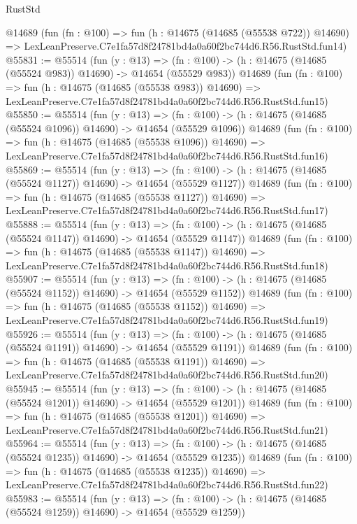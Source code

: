 \begin{lexlean}{RustStd}
\begin{coremodule}
    @14689
    (fun (fn : @100) =>
    fun (h : @14675 (@14685 (@55538 @722)) @14690) =>
    LexLeanPreserve.C7e1fa57d8f24781bd4a0a60f2bc744d6.R56.RustStd.fun14)
@55831 := @55514
    (fun (y : @13) =>
    (fn : @100) -> (h : @14675 (@14685 (@55524 @983)) @14690) -> @14654 (@55529 @983))
    @14689
    (fun (fn : @100) =>
    fun (h : @14675 (@14685 (@55538 @983)) @14690) =>
    LexLeanPreserve.C7e1fa57d8f24781bd4a0a60f2bc744d6.R56.RustStd.fun15)
@55850 := @55514
    (fun (y : @13) =>
    (fn : @100) -> (h : @14675 (@14685 (@55524 @1096)) @14690) -> @14654 (@55529 @1096))
    @14689
    (fun (fn : @100) =>
    fun (h : @14675 (@14685 (@55538 @1096)) @14690) =>
    LexLeanPreserve.C7e1fa57d8f24781bd4a0a60f2bc744d6.R56.RustStd.fun16)
@55869 := @55514
    (fun (y : @13) =>
    (fn : @100) -> (h : @14675 (@14685 (@55524 @1127)) @14690) -> @14654 (@55529 @1127))
    @14689
    (fun (fn : @100) =>
    fun (h : @14675 (@14685 (@55538 @1127)) @14690) =>
    LexLeanPreserve.C7e1fa57d8f24781bd4a0a60f2bc744d6.R56.RustStd.fun17)
@55888 := @55514
    (fun (y : @13) =>
    (fn : @100) -> (h : @14675 (@14685 (@55524 @1147)) @14690) -> @14654 (@55529 @1147))
    @14689
    (fun (fn : @100) =>
    fun (h : @14675 (@14685 (@55538 @1147)) @14690) =>
    LexLeanPreserve.C7e1fa57d8f24781bd4a0a60f2bc744d6.R56.RustStd.fun18)
@55907 := @55514
    (fun (y : @13) =>
    (fn : @100) -> (h : @14675 (@14685 (@55524 @1152)) @14690) -> @14654 (@55529 @1152))
    @14689
    (fun (fn : @100) =>
    fun (h : @14675 (@14685 (@55538 @1152)) @14690) =>
    LexLeanPreserve.C7e1fa57d8f24781bd4a0a60f2bc744d6.R56.RustStd.fun19)
@55926 := @55514
    (fun (y : @13) =>
    (fn : @100) -> (h : @14675 (@14685 (@55524 @1191)) @14690) -> @14654 (@55529 @1191))
    @14689
    (fun (fn : @100) =>
    fun (h : @14675 (@14685 (@55538 @1191)) @14690) =>
    LexLeanPreserve.C7e1fa57d8f24781bd4a0a60f2bc744d6.R56.RustStd.fun20)
@55945 := @55514
    (fun (y : @13) =>
    (fn : @100) -> (h : @14675 (@14685 (@55524 @1201)) @14690) -> @14654 (@55529 @1201))
    @14689
    (fun (fn : @100) =>
    fun (h : @14675 (@14685 (@55538 @1201)) @14690) =>
    LexLeanPreserve.C7e1fa57d8f24781bd4a0a60f2bc744d6.R56.RustStd.fun21)
@55964 := @55514
    (fun (y : @13) =>
    (fn : @100) -> (h : @14675 (@14685 (@55524 @1235)) @14690) -> @14654 (@55529 @1235))
    @14689
    (fun (fn : @100) =>
    fun (h : @14675 (@14685 (@55538 @1235)) @14690) =>
    LexLeanPreserve.C7e1fa57d8f24781bd4a0a60f2bc744d6.R56.RustStd.fun22)
@55983 := @55514
    (fun (y : @13) =>
    (fn : @100) -> (h : @14675 (@14685 (@55524 @1259)) @14690) -> @14654 (@55529 @1259))

\end{coremodule}
\end{lexlean}
